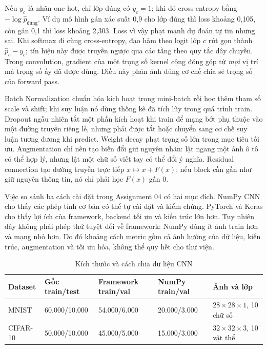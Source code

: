 \documentclass[12pt,a4paper]{report}
\begin{document}
Nếu $y_c$ là nhãn one-hot, chỉ lớp đúng có $y_c=1$; khi đó cross-entropy bằng $-\log\hat p_{\mathrm{đúng}}$. Ví dụ mô hình gán xác suất 0,9 cho lớp đúng thì loss khoảng 0,105, còn gán 0,1 thì loss khoảng 2,303. Loss vì vậy phạt mạnh dự đoán tự tin nhưng sai. Khi softmax đi cùng cross-entropy, đạo hàm theo logit lớp $c$ rút gọn thành $\hat p_c-y_c$; tín hiệu này được truyền ngược qua các tầng theo quy tắc dây chuyền. Trong convolution, gradient của một trọng số kernel cộng đóng góp từ \emph{mọi} vị trí mà trọng số ấy đã được dùng. Điều này phản ánh đúng cơ chế chia sẻ trọng số của forward pass.

Batch Normalization chuẩn hóa kích hoạt trong mini-batch rồi học thêm tham số scale và shift; khi suy luận nó dùng thống kê đã tích lũy trong quá trình train. Dropout ngẫu nhiên tắt một phần kích hoạt khi train để mạng bớt phụ thuộc vào một đường truyền riêng lẻ, nhưng phải được tắt hoặc chuyển sang cơ chế suy luận tương đương khi predict. Weight decay phạt trọng số lớn trong mục tiêu tối ưu. Augmentation chỉ nên tạo biến đổi giữ nguyên nhãn: lật ngang một ảnh ô tô có thể hợp lý, nhưng lật một chữ số viết tay có thể đổi ý nghĩa. Residual connection tạo đường truyền trực tiếp $x\mapsto x+F(x)$; nếu block cần gần như giữ nguyên thông tin, nó chỉ phải học $F(x)$ gần 0.

Việc so sánh ba cách cài đặt trong Assignment 04 có hai mục đích. NumPy CNN cho thấy các phép tính cơ bản có thể tự cài đặt và kiểm chứng. PyTorch và Keras cho thấy lợi ích của framework, backend tối ưu và kiến trúc lớn hơn. Tuy nhiên đây không phải phép thử tuyệt đối về framework: NumPy dùng ít ảnh train hơn và mạng nhỏ hơn. Do đó khoảng cách metric gồm cả ảnh hưởng của dữ liệu, kiến trúc, augmentation và tối ưu hóa, không thể quy hết cho thư viện.

\begin{table}[htbp]\centering\caption{Kích thước và cách chia dữ liệu CNN}\label{tab:cnn-splits}
\footnotesize\begin{tabularx}{\textwidth}{p{1.7cm}p{2.2cm}p{2.3cm}p{2.3cm}X}
\toprule\textbf{Dataset} & \textbf{Gốc train/test} & \textbf{Framework train/val} & \textbf{NumPy train/val} & \textbf{Ảnh và lớp}\\\midrule
MNIST & 60.000/10.000 & 54.000/6.000 & 20.000/3.000 & $28\times28\times1$, 10 chữ số\\
CIFAR-10 & 50.000/10.000 & 45.000/5.000 & 15.000/3.000 & $32\times32\times3$, 10 vật thể\\
\bottomrule\end{tabularx}\end{table}
\end{document}
